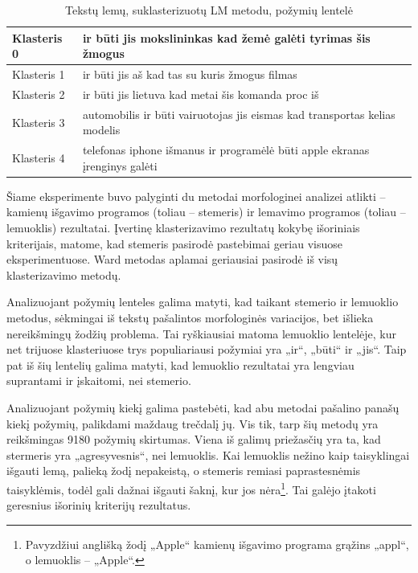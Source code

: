\documentclass{VUMIFInfBakalaurinis}
\begin{document}
\begin{table}[H]
  \centering
\caption{Tekstų lemų, suklasterizuotų LM metodu, požymių lentelė}
\small
\begin{tabular}{|l|l|}
\hline
Klasteris 0 & ir būti jis mokslininkas kad žemė galėti tyrimas šis žmogus                \\ \hline
Klasteris 1 & ir būti jis aš kad tas su kuris žmogus filmas                              \\ \hline
Klasteris 2 & ir būti jis lietuva kad metai šis komanda proc iš                          \\ \hline
Klasteris 3 & automobilis ir būti vairuotojas jis eismas kad transportas kelias modelis  \\ \hline
Klasteris 4 & telefonas iphone išmanus ir programėlė būti apple ekranas įrenginys galėti \\ \hline
\end{tabular}
\normalsize
\end{table}

Šiame eksperimente buvo palyginti du metodai morfologinei analizei
atlikti -- kamienų išgavimo programos (toliau -- stemeris) ir lemavimo
programos (toliau -- lemuoklis) rezultatai. Įvertinę klasterizavimo
rezultatų kokybę išoriniais kriterijais, matome, kad stemeris pasirodė
pastebimai geriau visuose eksperimentuose. Ward metodas aplamai
geriausiai pasirodė iš visų klasterizavimo metodų.

Analizuojant požymių lenteles galima matyti, kad taikant stemerio ir
lemuoklio metodus, sėkmingai iš tekstų pašalintos morfologinės
variacijos, bet išlieka nereikšmingų žodžių problema. Tai ryškiausiai
matoma lemuoklio lentelėje, kur net trijuose klasteriuose trys
populiariausi požymiai yra „ir“, „būti“ ir „jis“. Taip pat iš šių
lentelių galima matyti, kad lemuoklio rezultatai yra lengviau suprantami
ir įskaitomi, nei stemerio.

Analizuojant požymių kiekį galima pastebėti, kad abu metodai pašalino
panašų kiekį požymių, palikdami maždaug trečdalį jų. Vis tik, tarp šių
metodų yra reikšmingas 9180 požymių skirtumas. Viena iš galimų
priežasčių yra ta, kad stermeris yra „agresyvesnis“, nei lemuoklis. Kai
lemuoklis nežino kaip taisyklingai išgauti lemą, palieką žodį
nepakeistą, o stemeris remiasi paprastesnėmis taisyklėmis, todėl gali
dažnai išgauti šaknį, kur jos nėra\footnote{Pavyzdžiui anglišką žodį
  „Apple“ kamienų išgavimo programa grąžins „appl“, o lemuoklis --
  „Apple“.}. Tai galėjo įtakoti geresnius išorinių kriterijų
rezultatus.
\end{document}
